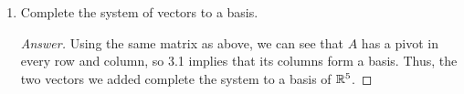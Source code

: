 \documentclass[../psets.tex]{subfiles}
\begin{document}
\begin{enumerate}[label={\textbf{5.\arabic*.}}]
\begin{enumerate}
\begin{proof}[Answer]
            If we add in $\eb_1$ and $\eb_3$ to the mix, then we can create the matrix
            \begin{equation*}
                A =
                \begin{pmatrix}
                    1 & 3  & 0 & 1    & 2\\
                    0 & -2 & 0 & 1    & -1\\
                    0 & 0  & 1 & 50   & 1\\
                    0 & 0  & 0 & -921 & 5\\
                    0 & 0  & 0 & 0    & -3\\
                \end{pmatrix}
            \end{equation*}
            $A$ is already in eschelon form ($A=A_e$) and $A=A_e$ has a pivot in every column, so 3.1 implies that the vectors of $A$ are linearly independent.
        \end{proof}
        \item Complete the system of vectors to a basis.
        \begin{proof}[Answer]
            Using the same matrix as above, we can see that $A$ has a pivot in every row and column, so 3.1 implies that its columns form a basis. Thus, the two vectors we added complete the system to a basis of $\mathbb{R}^5$.
        \end{proof}
    \end{enumerate}
\end{enumerate}
\end{document}
